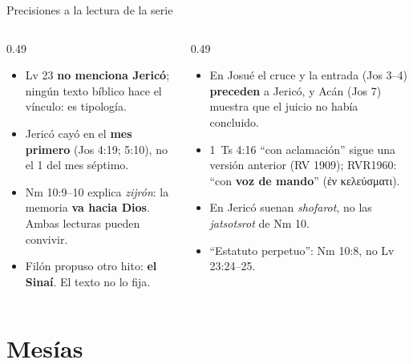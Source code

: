 \documentclass[hyperref={bookmarks=false},aspectratio=169]{beamer}
\newcommand{\grc}[1]{\foreignlanguage{ancientgreek}{#1}}
\begin{document}
\begin{frame}{Precisiones a la lectura de la serie}
\scriptsize\RaggedRight
\begin{columns}[t,onlytextwidth]
\begin{column}{0.49\textwidth}
\begin{itemize}
\item Lv 23 \textbf{no menciona Jericó}; ningún texto bíblico hace el vínculo: es tipología.
\item Jericó cayó en el \textbf{mes primero} (Jos 4:19; 5:10), no el 1 del mes séptimo.
\item Nm 10:9--10 explica \emph{zijrón}: la memoria \textbf{va hacia Dios}. Ambas lecturas pueden convivir.
\item Filón propuso otro hito: \textbf{el Sinaí}. El texto no lo fija.
\end{itemize}
\end{column}
\begin{column}{0.49\textwidth}
\begin{itemize}
\item En Josué el cruce y la entrada (Jos 3--4) \textbf{preceden} a Jericó, y Acán (Jos 7) muestra que el juicio no había concluido.
\item 1~Ts 4:16 ``con aclamación'' sigue una versión anterior (RV 1909); RVR1960: ``con \textbf{voz de mando}'' (\grc{ἐν κελεύσματι}).
\item En Jericó suenan \emph{shofarot}, no las \emph{jatsotsrot} de Nm 10.
\item ``Estatuto perpetuo'': Nm 10:8, no Lv 23:24--25.
\end{itemize}
\end{column}
\end{columns}
\end{frame}

\section{Mesías}
\end{document}
